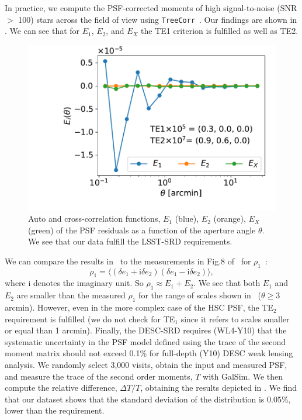 \documentclass[\docopts]{\docclass}
\begin{document}
In practice, we compute the PSF-corrected moments of high signal-to-noise (SNR $>$ 100) stars across the field of view using \texttt{TreeCorr}~\citep{2004MNRAS.352..338J}. Our findings are shown in . We can see that for $E_{1}$, $E_{2}$, and $E_{X}$ the TE1 criterion is fulfilled as well as TE2.
\begin{figure}
\centering
\includegraphics[width=0.85\columnwidth]{TEx}
\caption{Auto and cross-correlation functions, $E_{1}$ (blue), $E_{2}$ (orange), $E_{X}$ (green) of the PSF residuals as a function of the aperture angle $\theta$. We see that our data fulfill the LSST-SRD requirements.}
\label{fig:TEx}
\end{figure}
We can compare the results in~ to the measurements in Fig.8 of~\citet{2018PASJ...70S..25M} for $\rho_{1}$~\citep{2010MNRAS.404..350R}:
\begin{equation}
\rho_{1} = \langle (\delta e_{1}+\mathrm{i}\delta e_{2})(\delta e_{1}-\mathrm{i} \delta e_{2}) \rangle,
\end{equation}
where $\mathrm{i}$ denotes the imaginary unit. So $\rho_{1} \approx E_{1} + E_{2}$. We see that both $E_{1}$ and $E_{2}$ are smaller than the measured $\rho_{1}$ for the range of scales shown in~\citet{2018PASJ...70S..25M} ($\theta \geq 3$ arcmin). However, even in the more complex case of the HSC PSF, the TE$_{2}$ requirement is fulfilled (we do not check for TE$_{1}$  since it refers to scales smaller or equal than 1 arcmin).
Finally, the DESC-SRD requires (WL4-Y10) that the systematic uncertainty in the PSF model defined using the trace of the second moment matrix should not exceed 0.1\% for full-depth (Y10) DESC weak lensing analysis. We randomly select 3,000 visits, obtain the input and measured PSF, and measure the trace of the second order moments, $T$ with GalSim. We then compute the relative difference, $\Delta T/T$, obtaining the results depicted in . We find that our dataset shows that the standard deviation of the distribution is 0.05\%, lower than the requirement.
\end{document}
